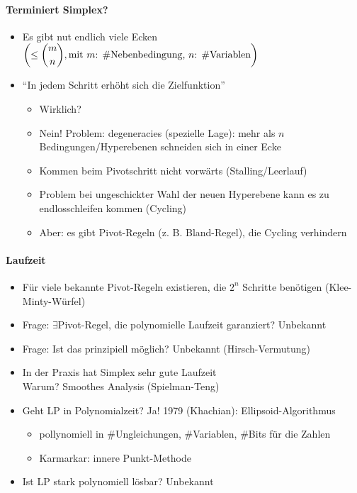 \paragraph*{Terminiert Simplex?}
\begin{itemize}
 \item Es gibt nut endlich viele Ecken $\left(\leq \dbinom{m}{n}, \text{mit $m$: \#Nebenbedingung, $n$: \#Variablen}\right)$
 \item "`In jedem Schritt erhöht sich die Zielfunktion"' 
 \begin{itemize}
  \item Wirklich? 
  \item Nein! Problem: degeneracies (spezielle Lage): mehr als $n$ Bedingungen/Hyperebenen schneiden sich in einer Ecke
  \item Kommen beim Pivotschritt nicht vorwärts (Stalling/Leerlauf)
  \item Problem bei ungeschickter Wahl der neuen Hyperebene kann es zu endlosschleifen kommen (Cycling)
  \item Aber: es gibt Pivot-Regeln (z. B. Bland-Regel), die Cycling verhindern
 \end{itemize}
\end{itemize}

\paragraph*{Laufzeit}
\begin{itemize}
 \item Für viele bekannte Pivot-Regeln existieren, die $2^n$ Schritte benötigen (Klee-Minty-Würfel)
 \item Frage: $\exists$Pivot-Regel, die polynomielle Laufzeit garanziert? Unbekannt
 \item Frage: Ist das prinzipiell möglich? Unbekannt (Hirsch-Vermutung)
 \item In der Praxis hat Simplex sehr gute Laufzeit\\
     Warum? Smoothes Analysis (Spielman-Teng)
 \item Geht LP in Polynomialzeit? Ja! 1979 (Khachian): Ellipsoid-Algorithmus
     \begin{itemize}
      \item pollynomiell in \#Ungleichungen, \#Variablen, \#Bits für die Zahlen
      \item Karmarkar: innere Punkt-Methode
     \end{itemize}
 \item Ist LP stark polynomiell lösbar? Unbekannt
\end{itemize}

